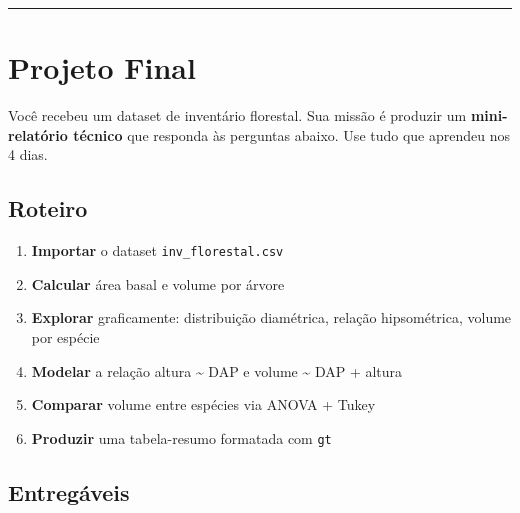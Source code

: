 \documentclass[
  letterpaper,
]{scrbook}
\providecommand{\tightlist}{%
  \setlength{\itemsep}{0pt}\setlength{\parskip}{0pt}}
\begin{document}
\begin{center}\rule{0.5\linewidth}{0.5pt}\end{center}

\section{Projeto Final}\label{projeto-final}

\begin{tcolorbox}[enhanced jigsaw, arc=.35mm, bottomrule=.15mm, bottomtitle=1mm, breakable, colback=white, colbacktitle=quarto-callout-important-color!10!white, colframe=quarto-callout-important-color-frame, coltitle=black, left=2mm, leftrule=.75mm, opacityback=0, opacitybacktitle=0.6, rightrule=.15mm, title=\textcolor{quarto-callout-important-color}{\faExclamation}\hspace{0.5em}{Seu desafio final}, titlerule=0mm, toprule=.15mm, toptitle=1mm]

Você recebeu um dataset de inventário florestal. Sua missão é produzir
um \textbf{mini-relatório técnico} que responda às perguntas abaixo. Use
tudo que aprendeu nos 4 dias.

\end{tcolorbox}

\subsection{Roteiro}\label{roteiro}

\begin{enumerate}
\def\labelenumi{\arabic{enumi}.}
\tightlist
\item
  \textbf{Importar} o dataset \texttt{inv\_florestal.csv}
\item
  \textbf{Calcular} área basal e volume por árvore
\item
  \textbf{Explorar} graficamente: distribuição diamétrica, relação
  hipsométrica, volume por espécie
\item
  \textbf{Modelar} a relação altura \textasciitilde{} DAP e volume
  \textasciitilde{} DAP + altura
\item
  \textbf{Comparar} volume entre espécies via ANOVA + Tukey
\item
  \textbf{Produzir} uma tabela-resumo formatada com \texttt{gt}
\end{enumerate}

\subsection{Entregáveis}\label{entreguxe1veis}
\end{document}
